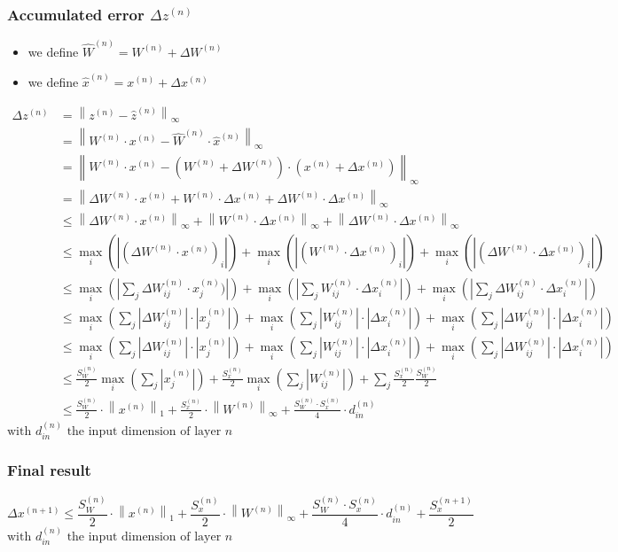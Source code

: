 \documentclass[11pt, a4paper]{article}
\newcommand{\norm}[1]{\left\|#1\right\|}
\newcommand{\zn}{z^{(n)}}
\newcommand{\znhat}{\hat{z}^{(n)}}
\newcommand{\Wn}{W^{(n)}}
\newcommand{\Wnhat}{\hat{W}^{(n)}}
\newcommand{\xn}{x^{(n)}}
\newcommand{\xnhat}{\hat{x}^{(n)}}
\newcommand{\SWn}{S_W^{(n)}}
\newcommand{\Sxn}{S_x^{(n)}}
\newcommand{\Sxnpo}{S_x^{(n+1)}}
\newcommand{\xnpo}{x^{(n+1)}}
\begin{document}
\subsubsection{Accumulated error $\Delta \zn$}

\begin{itemize}
    \item we define $\Wnhat = \Wn + \Delta \Wn$
	\item we define $\xnhat = \xn + \Delta \xn$
\end{itemize}

\begin{align*}
\Delta \zn &= \norm{\zn - \znhat}_{\infty} \\
&= \norm{ \Wn \cdot \xn - \Wnhat \cdot \xnhat }_{\infty} \\
&= \norm{\Wn \cdot \xn - (\Wn + \Delta \Wn) \cdot (\xn + \Delta \xn)}_{\infty} \\
&= \norm{\Delta \Wn \cdot \xn + \Wn \cdot \Delta \xn + \Delta \Wn \cdot \Delta \xn}_{\infty} \\
&\leq \norm{\Delta \Wn \cdot \xn}_{\infty} + \norm{\Wn \cdot \Delta \xn}_{\infty} + \norm{\Delta \Wn \cdot \Delta \xn}_{\infty} \\
&\leq \max_i(|(\Delta \Wn \cdot \xn)_i|) + \max_i(|(\Wn \cdot \Delta \xn)_i|) + \max_i(|(\Delta \Wn \cdot \Delta \xn)_i|) \\
&\leq \max_i(|\sum_{j} \Delta \Wn_{ij} \cdot \xn_j)|) + \max_i(|\sum_{j} \Wn_{ij} \cdot \Delta \xn_i|) + \max_i(|\sum_{j} \Delta \Wn_{ij} \cdot \Delta \xn_i|) \\
&\leq \max_i(\sum_{j} |\Delta \Wn_{ij}| \cdot |\xn_j|) + \max_i(\sum_{j} |\Wn_{ij}| \cdot |\Delta \xn_i|) + \max_i(\sum_{j} |\Delta \Wn_{ij}| \cdot |\Delta \xn_i|) \\
&\leq \max_i(\sum_{j} |\Delta \Wn_{ij}| \cdot |\xn_j|) + \max_i(\sum_{j} |\Wn_{ij}| \cdot |\Delta \xn_i|) + \max_i(\sum_{j} |\Delta \Wn_{ij}| \cdot |\Delta \xn_i|) \\
&\leq \frac{\SWn}{2} \max_i(\sum_{j} |\xn_j|) + \frac{\Sxn}{2}\max_i(\sum_{j} |\Wn_{ij}|) + \sum_{j} \frac{\Sxn}{2} \frac{\SWn}{2} \\
&\leq \frac{\SWn}{2} \cdot \norm{\xn}_1 +  \frac{\Sxn}{2} \cdot \norm{\Wn}_{\infty} + \frac{\SWn \cdot \Sxn}{4} \cdot d_{in}^{(n)}
\end{align*}
$
\text{with } d_{in}^{(n)} \text{ the input dimension of layer } n
$

\subsubsection{Final result}
$$
\Delta \xnpo \leq
\frac{\SWn}{2} \cdot \norm{\xn}_1 +  \frac{\Sxn}{2} \cdot \norm{\Wn}_{\infty} + \frac{\SWn \cdot \Sxn}{4} \cdot d_{in}^{(n)} + \frac{\Sxnpo}{2}
$$
$\text{with } d_{in}^{(n)} \text{ the input dimension of layer } n$

\printbibliography
\end{document}
